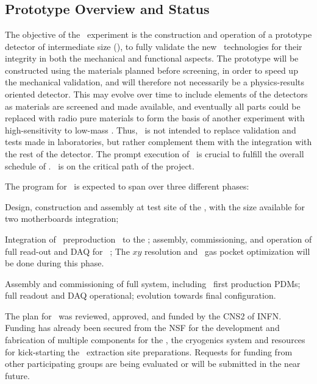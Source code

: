 \section{\DSp}
\label{sec:Proto}

\subsection{Prototype Overview and Status}
The objective of the \DSps\ experiment is the construction and operation of a prototype detector of intermediate size (\DSpApproximateMass), to fully validate the new \DSks\ technologies for their integrity in both the mechanical and functional aspects.  The prototype will be constructed using the materials planned before screening, in order to speed up the mechanical validation, and will therefore not necessarily be a physics-results oriented detector. This may evolve over time to include elements of the detectors as materials are screened and made available, and eventually all parts could be replaced with radio pure materials to form the basis of another experiment with high-sensitivity to low-mass \WIMPs.  Thus, \DSps\  is not intended to replace validation and tests made in laboratories, but rather complement them with the integration with the rest of the detector.  The prompt execution of \DSps\ is crucial to fulfill the overall schedule of \DSks.  \DSps\ is on the critical path of the project.

The program for \DSps\ is expected to span over three different phases:
\begin{compactenum}
\item Design, construction and assembly at test site of the \LArTPC, with the size available for two motherboards integration;
\item Integration of \DSpZeroPdmsNumber\ preproduction \DSkPdms\ to the \LArTPC; assembly, commissioning, and operation of full read-out and DAQ for \DSpZeroPdmsNumber\ \DSkPdms; The $x y$ resolution and \STwo\ gas pocket optimization will be done during this phase.
\item Assembly and commissioning of full system, including \DSpPdmsNumber\ first production PDMs; full readout and DAQ operational; evolution towards final configuration. 
\end{compactenum}

The plan for \DSps\ was reviewed, approved, and funded by the CNS2 of INFN. Funding has already been secured from the NSF for the development and fabrication of multiple components for the \TPC, the cryogenics system and resources for kick-starting the \UAr\ extraction site preparations.  Requests for funding from other participating groups are being evaluated or will be submitted in the near future.

